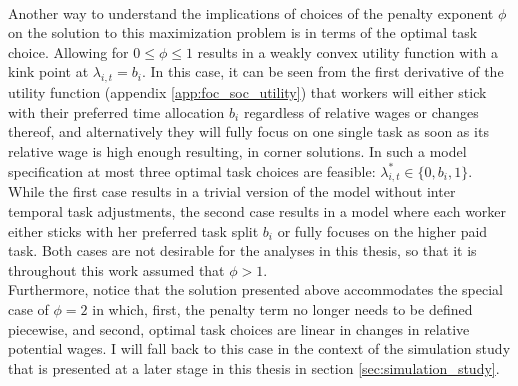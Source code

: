 \documentclass[../main.tex]{subfiles}
\begin{document}
\\
Another way to understand the implications of choices of the penalty exponent $\phi$ on the solution to this maximization problem is in terms of the optimal task choice. Allowing for $0 \leq \phi \leq 1$ results in a weakly convex utility function with a kink point at $\lambda_{i,t} = b_i$. In this case, it can be seen from the first derivative of the utility function (appendix \ref{app:foc_soc_utility}) that workers will either stick with their preferred time allocation $b_i$ regardless of relative wages or changes thereof, and alternatively they will fully focus on one single task as soon as its relative wage is high enough resulting, in corner solutions. In such a model specification at most three optimal task choices are feasible: $\lambda_{i,t}^* \in \{0, b_i, 1\}$. While the first case results in a trivial version of the model without inter temporal task adjustments, the second case results in a model where each worker either sticks with her preferred task split $b_i$ or fully focuses on the higher paid task. Both cases are not desirable for the analyses in this thesis, so that it is throughout this work assumed that $\phi > 1$.
\\
Furthermore, notice that the solution presented above accommodates the special case of $\phi = 2$ in which, first, the penalty term no longer needs to be defined piecewise, and second, optimal task choices are linear in changes in relative potential wages. I will fall back to this case in the context of the simulation study that is presented at a later stage in this thesis in section \ref{sec:simulation_study}.
\end{document}
